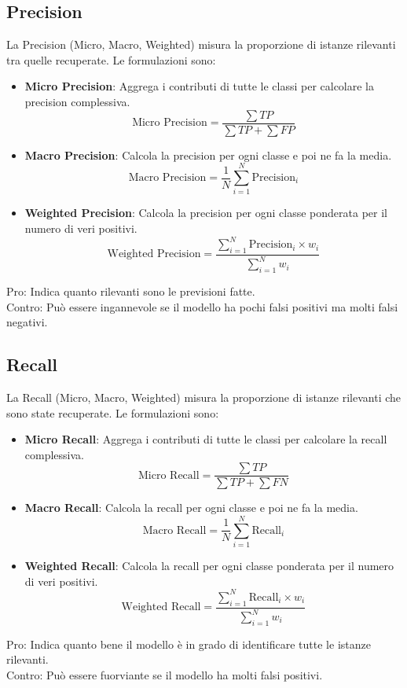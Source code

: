 \documentclass[../../Thesis.tex]{subfiles}
\begin{document}
\subsection*{Precision}
La Precision (Micro, Macro, Weighted) misura la proporzione di istanze rilevanti tra quelle recuperate. Le formulazioni sono:
\begin{itemize}
    \item \textbf{Micro Precision}: Aggrega i contributi di tutte le classi per calcolare la precision complessiva.
    $$ \text{Micro Precision} = \frac{\sum TP}{\sum TP + \sum FP} $$
    \item \textbf{Macro Precision}: Calcola la precision per ogni classe e poi ne fa la media.
    $$ \text{Macro Precision} = \frac{1}{N} \sum_{i=1}^{N} \text{Precision}_i $$
    \item \textbf{Weighted Precision}: Calcola la precision per ogni classe ponderata per il numero di veri positivi.
    $$ \text{Weighted Precision} = \frac{\sum_{i=1}^{N} \text{Precision}_i \times w_i}{\sum_{i=1}^{N} w_i} $$
\end{itemize}
Pro: Indica quanto rilevanti sono le previsioni fatte.\\
Contro: Può essere ingannevole se il modello ha pochi falsi positivi ma molti falsi negativi.

\subsection*{Recall}
La Recall (Micro, Macro, Weighted) misura la proporzione di istanze rilevanti che sono state recuperate. Le formulazioni sono:
\begin{itemize}
    \item \textbf{Micro Recall}: Aggrega i contributi di tutte le classi per calcolare la recall complessiva.
    $$ \text{Micro Recall} = \frac{\sum TP}{\sum TP + \sum FN} $$
    \item \textbf{Macro Recall}: Calcola la recall per ogni classe e poi ne fa la media.
    $$ \text{Macro Recall} = \frac{1}{N} \sum_{i=1}^{N} \text{Recall}_i $$
    \item \textbf{Weighted Recall}: Calcola la recall per ogni classe ponderata per il numero di veri positivi.
    $$ \text{Weighted Recall} = \frac{\sum_{i=1}^{N} \text{Recall}_i \times w_i}{\sum_{i=1}^{N} w_i} $$
\end{itemize}
Pro: Indica quanto bene il modello è in grado di identificare tutte le istanze rilevanti.\\
Contro: Può essere fuorviante se il modello ha molti falsi positivi.
\end{document}
